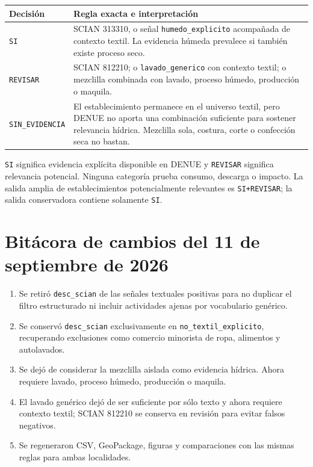 \documentclass[11pt,letterpaper]{article}
\begin{document}
\begin{longtable}{p{}p{}}
\toprule
Decisi\'on & Regla exacta e interpretaci\'on\\
\midrule
\endhead
\texttt{SI} & SCIAN 313310, o se\~nal \texttt{humedo\_explicito} acompa\~nada de contexto textil. La evidencia h\'umeda prevalece si tambi\'en existe proceso seco.\\
\texttt{REVISAR} & SCIAN 812210; o \texttt{lavado\_generico} con contexto textil; o mezclilla combinada con lavado, proceso h\'umedo, producci\'on o maquila.\\
\texttt{SIN\_EVIDENCIA} & El establecimiento permanece en el universo textil, pero DENUE no aporta una combinaci\'on suficiente para sostener relevancia h\'idrica. Mezclilla sola, costura, corte o confecci\'on seca no bastan.\\
\bottomrule
\end{longtable}

\texttt{SI} significa evidencia expl\'icita disponible en DENUE y \texttt{REVISAR} significa relevancia potencial. Ninguna categor\'ia prueba consumo, descarga o impacto. La salida amplia de establecimientos potencialmente relevantes es \texttt{SI+REVISAR}; la salida conservadora contiene solamente \texttt{SI}.

\section{Bit\'acora de cambios del 11 de septiembre de 2026}

\begin{enumerate}[label=\arabic*.]
  \item Se retir\'o \texttt{desc\_scian} de las se\~nales textuales positivas para no duplicar el filtro estructurado ni incluir actividades ajenas por vocabulario gen\'erico.
  \item Se conserv\'o \texttt{desc\_scian} exclusivamente en \texttt{no\_textil\_explicito}, recuperando exclusiones como comercio minorista de ropa, alimentos y autolavados.
  \item Se dej\'o de considerar la mezclilla aislada como evidencia h\'idrica. Ahora requiere lavado, proceso h\'umedo, producci\'on o maquila.
  \item El lavado gen\'erico dej\'o de ser suficiente por s\'olo texto y ahora requiere contexto textil; SCIAN 812210 se conserva en revisi\'on para evitar falsos negativos.
  \item Se regeneraron CSV, GeoPackage, figuras y comparaciones con las mismas reglas para ambas localidades.
\end{enumerate}
\end{document}
